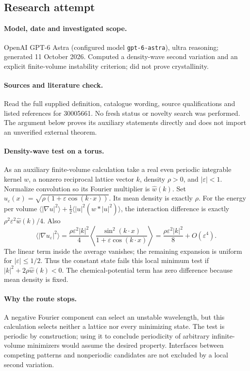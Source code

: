 \documentclass[11pt]{article}
\begin{document}
\subsection{Research attempt}
\paragraph{Model, date and investigated scope.}
OpenAI GPT-6 Astra (configured model \texttt{gpt-6-astra}), ultra reasoning; generated 11 October 2026. Computed a density-wave second variation and an explicit finite-volume instability criterion; did not prove crystallinity.

\paragraph{Sources and literature check.}
Read the full supplied definition, catalogue wording, source qualifications and listed references for 30005661. No fresh status or novelty search was performed. The argument below proves its auxiliary statements directly and does not import an unverified external theorem.

\paragraph{Density-wave test on a torus.} As an auxiliary finite-volume calculation take a real even periodic integrable kernel \(w\), a nonzero reciprocal lattice vector \(k\), density \(\rho>0\), and \(|\varepsilon|<1\). Normalize convolution so its Fourier multiplier is \(\widehat w(k)\). Set \(u_\varepsilon(x)=\sqrt{\rho(1+\varepsilon\cos(k\cdot x))}\). Its mean density is exactly \(\rho\). For the energy per volume \(\langle|\nabla u|^2\rangle+\frac12\langle|u|^2(w*|u|^2)\rangle\), the interaction difference is exactly \(\rho^2\varepsilon^2\widehat w(k)/4\). Also
\[
 \langle|\nabla u_\varepsilon|^2\rangle
 =\frac{\rho\varepsilon^2|k|^2}{4}
 \left\langle\frac{\sin^2(k\cdot x)}{1+\varepsilon\cos(k\cdot x)}\right\rangle
 =\frac{\rho\varepsilon^2|k|^2}{8}+O(\varepsilon^4).
\]
The linear term inside the average vanishes; the remaining expansion is uniform for \(|\varepsilon|\leq1/2\). Thus the constant state fails this local minimum test if \(|k|^2+2\rho\widehat w(k)<0\). The chemical-potential term has zero difference because mean density is fixed.
\paragraph{Why the route stops.} A negative Fourier component can select an unstable wavelength, but this calculation selects neither a lattice nor every minimizing state. The test is periodic by construction; using it to conclude periodicity of arbitrary infinite-volume minimizers would assume the desired property. Interfaces between competing patterns and nonperiodic candidates are not excluded by a local second variation.
\end{document}
